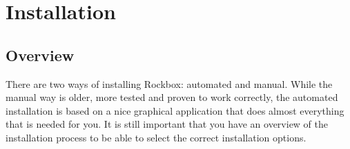 \chapter{Installation}\label{sec:installation}


\section{Overview}
There are two ways of installing Rockbox: automated and manual. While the
manual way is older, more tested and proven to work correctly, the
automated installation is based on a nice graphical application that does
almost everything that is needed for you. It is still important that you have
an overview of the installation process to be able to select the correct
installation options.

